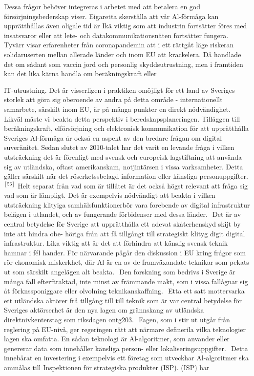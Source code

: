 {{{{{{{{Dessa frågor behöver integreras i arbetet med att betalera en god försörjningsbederskap viser. Eigaretta skerställa att vår Al-förmåga kan upprätthållas även oligale tid är Ikä viktig som att industrin fortsätter föres med insatsvaror eller att lete- och datakommunikationsnäten fortsätter fungera. Tyvärr visar erfarenheter från coronapandemin att i ett rättgåt läge riskeran solidaruserten mellan allerade länder och inom EU att krackelera. Då handlade det om sådant som vaccin jord och personlig skyddsutrustning, men i framtiden kan det lika kärna handla om beräkningskraft eller

IT-utrustning. Det är visserligen i praktiken omöjligt för ett land av Sveriges storlek att göra sig oberoende av andra på detta område - internationellt samarbete, särskilt inom EU, är på många punkter en direkt nödvändighet. Likväl måste vi beakta detta perspektiv i beredskapsplaneringen.
Tillåggen till beråkningskraft, elförsörjning och elektronisk kommunikation för att upprätthålla Sveriges Al-förmåga år också en aspekt av den bredare frågan om digital suveränitet. Sedan slutet av 2010-talet har det varit en levande fråga i vilken utsträckning det är förenligt med svensk och europeisk lagstiftning att använda sig av utländska, oftast amerikanskam, notjintärsen i vissa varksamheter. Detta gäller särskilt när det röserketssbelagd information eller känsliga personuppgifter. \({ }^{[56]}\) Helt separat från vad som är tillåtet är det också högst relevant att fråga sig vad som är lämpligt. Det är exempelvis nödvändigt att beakta i vilken utsträckning klityiga samhälsfunktionerbör vara forebende av digital infrastruktur belägen i utlandet, och av fungerande förbidenser med dessa länder. \({ }^{}\)
Det är av central betydelse för Sverige att upprätthålla ett adevat skåterhenskyd skijt by inte att hindra obe- höriga från att få tillgångt till strategiskt klityg digit digital infrastruktur. Lika viktig att år det att förhindra att känslig svensk teknik hamnar i fél hander. För närvarande pågår den diskussion i EU kring frågor som rör ekonomisk miskerkhet, där Al är en av de framväxandate teknikar som pekats ut som särskilt angelägen alt beakta. \({ }^{}\) Den forskning som bedrivs i Sverige är många fall efterftraktad, inte minst av främmande makt, som i vissa fallågnar sig åt förknssponiggare eller olvolning teknikanskaffning. \({ }^{}\)
Etta ett satt mottervarka ett utländska aktörer frå tillgång till till teknik som är var central betydelse för Sveriges aktörserhet är den nya lagen om grännskang av utländska direktnivkenterstag som riksdagen ontg203. \({ }^{}\) Fagen, som i stir ut utgår från reglering på EU-nivå, ger regeringen rätt att närmare definerila vilka teknologier lagen ska omfatta. En sådan teknologi är Al-algoritmer, som anvander eller genererar data som innehåller känsliga person- eller lokaliseringsuppgifter. \({ }^{}\) Detta innebårat en investering i exempelvis ett företag som utveckhar Al-algoritmer ska ammålas till Inspektionen för strategiska produkter (ISP). (ISP) har
}}}}}}}}
